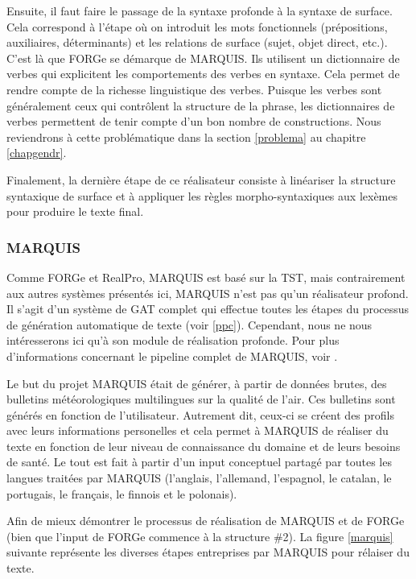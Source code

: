 Ensuite, il faut faire le passage de la syntaxe profonde à la syntaxe de surface. Cela correspond à l'étape où on introduit les mots fonctionnels (prépositions, auxiliaires, déterminants) et les relations de surface (sujet, objet direct, etc.). C'est là que FORGe se démarque de MARQUIS. Ils utilisent un dictionnaire de verbes qui explicitent les comportements des verbes en syntaxe. Cela permet de rendre compte de la richesse linguistique des verbes. Puisque les verbes sont généralement ceux qui contrôlent la structure de la phrase, les dictionnaires de verbes permettent de tenir compte d'un bon nombre de constructions. Nous reviendrons à cette problématique dans la section \ref{problema} au chapitre \ref{chapgendr}.

Finalement, la dernière étape de ce réalisateur consiste à linéariser la structure syntaxique de surface et à appliquer les règles morpho-syntaxiques aux lexèmes pour produire le texte final.

\subsubsection{MARQUIS}\label{sectionmarquis}
Comme FORGe et RealPro, MARQUIS est basé sur la \ac{TST}, mais contrairement aux autres systèmes présentés ici, MARQUIS n'est pas qu'un réalisateur profond. Il s'agit d'un système de \ac{GAT} complet qui effectue toutes les étapes du processus de génération automatique de texte (voir \ref{ppc}). Cependant, nous ne nous intéresserons ici qu'à son module de réalisation profonde.\citep{Lareau2007TowardsAG} Pour plus d'informations concernant le pipeline complet de MARQUIS, voir \citep{WannerMARQUISGENERATIONUSERTAILORED2010}. 

Le but du projet MARQUIS était de générer, à partir de données brutes, des bulletins météorologiques multilingues sur la qualité de l'air. Ces bulletins sont générés en fonction de l'utilisateur. Autrement dit, ceux-ci se créent des profils avec leurs informations personelles et cela permet à MARQUIS de réaliser du texte en fonction de leur niveau de connaissance du domaine et de leurs besoins de santé. Le tout est fait à partir d'un input conceptuel partagé par toutes les langues traitées par MARQUIS (l'anglais, l'allemand, l'espagnol, le catalan, le portugais, le français, le finnois et le polonais). 

Afin de mieux démontrer le processus de réalisation de MARQUIS et de FORGe (bien que l'input de FORGe commence à la structure \#2). La figure \ref{marquis} suivante représente les diverses étapes entreprises par MARQUIS pour rélaiser du texte.

